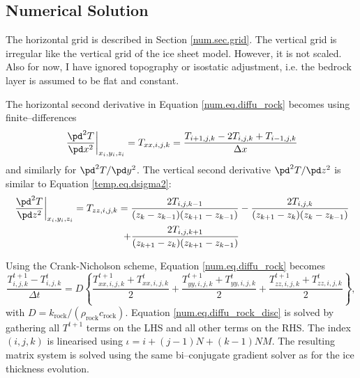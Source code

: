 \subsection{Numerical Solution}
The horizontal grid is described in Section \ref{num.sec.grid}. The vertical grid is irregular like the vertical grid of the ice sheet model. However, it is not scaled. Also for now, I have ignored topography or isostatic adjustment, i.e. the bedrock layer is assumed to be flat and constant.

The horizontal second derivative in Equation \eqref{num.eq.diffu_rock} becomes using finite--differences
\begin{equation}
  \left.\frac{\pd^2T}{\pd x^2}\right|_{x_i,y_i,z_i} = T_{xx,i,j,k} = \frac{T_{i+1,j,k}-2T_{i,j,k}+T_{i-1,j,k}}{\Delta x}
\end{equation}
and similarly for $\pd^2T/\pd y^2$. The vertical second derivative $\pd^2T/\pd z^2$ is similar to Equation \eqref{temp.eq.dsigma2}:
\begin{multline}
  \left.\frac{\pd^2 T}{\pd z^2}\right|_{x_i,y_i,z_i} = T_{zz,i,j,k} = \frac{2T_{i,j,k-1}}{(z_k-z_{k-1})(z_{k+1}-z_{k-1})} - \frac{2T_{i,j,k}}{(z_{k+1}-z_k)(z_k-z_{k-1})}\\
  + \frac{2T_{i,j,k+1}}{(z_{k+1}-z_k)(z_{k+1}-z_{k-1})}
\end{multline}


Using the Crank-Nicholson scheme, Equation \eqref{num.eq.diffu_rock} becomes
\begin{equation}
  \label{num.eq.diffu_rock_disc}
  \frac{T_{i,j,k}^{t+1}-T_{i,j,k}^{t}}{\Delta t}=D\left\{\frac{T_{xx,i,j,k}^{t+1}+T_{xx,i,j,k}^{t}}2 + \frac{T_{yy,i,j,k}^{t+1}+T_{yy,i,j,k}^{t}}2 + \frac{T_{zz,i,j,k}^{t+1}+T_{zz,i,j,k}^{t}}2 \right\},
\end{equation}
with $D=k_{\text{rock}}/(\rho_{\text{rock}}c_{\text{rock}})$. Equation \eqref{num.eq.diffu_rock_disc} is solved by gathering all $T^{t+1}$ terms on the LHS and all other terms on the RHS. The index $(i,j,k)$ is linearised using $\iota = i+(j-1)N+(k-1)NM$. The resulting matrix system is solved using the same bi--conjugate gradient solver as for the ice thickness evolution.

